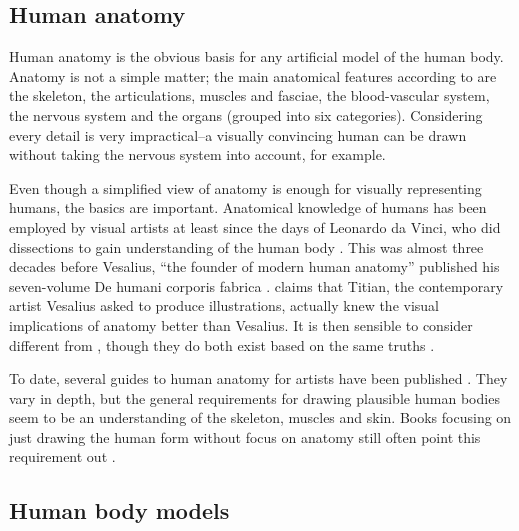 \subsection{Human anatomy}
Human anatomy is the obvious basis for any artificial model of the human body. Anatomy is not a simple matter; the main anatomical features according to  \citep{pick1977gray} are the skeleton, the articulations, muscles and fasciae, the blood-vascular system, the nervous system and the organs (grouped into six categories). Considering every detail is very impractical--a visually convincing human can be drawn without taking the nervous system into account, for example.

Even though a simplified view of anatomy is enough for visually representing humans, the basics are important. Anatomical knowledge of humans has been employed by visual artists at least since the days of Leonardo da Vinci, who did dissections to gain understanding of the human body \citep{keele1964leonardo}. This was almost three decades before Vesalius, ``the founder of modern human anatomy'' published his seven-volume De humani corporis fabrica \citep{vesalius1543}. \citet{hogarth2003} claims that Titian, the contemporary artist Vesalius asked to produce illustrations, actually knew the visual implications of anatomy better than Vesalius. It is then sensible to consider  different from , though they do both exist based on the same truths \citep{hogarth2003}.

To date, several guides to human anatomy for artists have been published \autocites{hogarth2003}{simblet2001}{goldfinger1991}. They vary in depth, but the general requirements for drawing plausible human bodies seem to be an understanding of the skeleton, muscles and skin. Books focusing on just drawing the human form without focus on anatomy still often point this requirement out \autocites{ediciones2004}{loomis1943figure}.



\subsection{Human body models}

